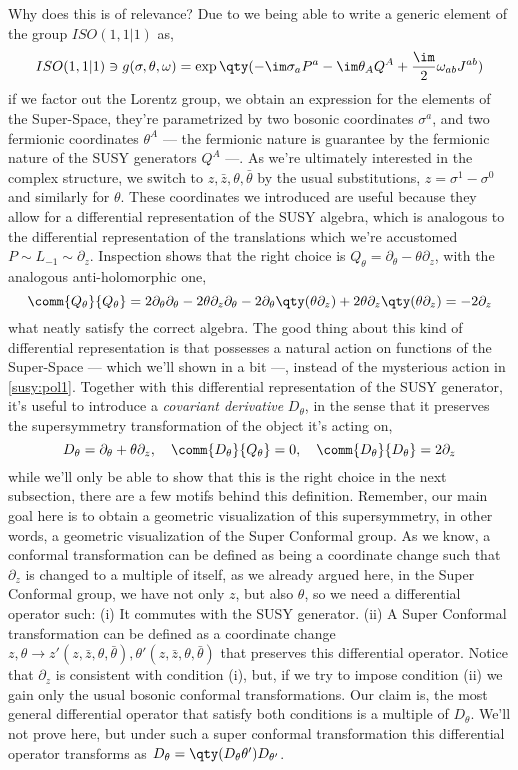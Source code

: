 Why does this is of relevance? Due to we being able to write a generic element of the group $ISO(1,1|1)$ as,
$$ISO(1,1|1)\ni g(\sigma,\theta,\omega)=\exp\qty(-\im \sigma_aP^a-\im \theta_A Q^A+\frac\im2\omega_{ab}J^{ab})$$
if we factor out the Lorentz group, we obtain an expression for the elements of the Super-Space, they're 
parametrized by two bosonic coordinates $\sigma^a$, and two fermionic coordinates $\theta^A$ --- 
the fermionic nature is guarantee by the fermionic nature of the SUSY generators $Q^A$ ---. As 
we're ultimately interested in the complex structure, we switch to $z,\bar z,\theta,\bar\theta$ by 
the usual substitutions, $z=\sigma^1-\sigma^0$ and similarly for $\theta$. These coordinates we introduced 
are useful because they allow for a differential representation of the SUSY algebra, which is analogous 
to the differential representation of the translations which we're accustomed $P\sim L_{-1}\sim \partial_z$. 
Inspection shows that the right choice is $Q_\theta=\partial_\theta-\theta\partial_z$, with the analogous 
anti-holomorphic one, $$\comm{Q_\theta}{Q_\theta}=2\partial_\theta\partial_\theta-2\theta\partial_z\partial_\theta-2\partial_\theta\qty(\theta\partial_z)+2\theta\partial_z\qty(\theta\partial_z)=-2\partial_z$$
what neatly satisfy the correct algebra. The good thing about this kind of differential representation is that 
possesses a natural action on functions of the Super-Space --- which we'll shown in a bit ---, instead of the mysterious action in \eqref{susy:pol1}. 
Together with this differential representation of the SUSY generator, it's useful to introduce a 
\textit{covariant derivative} $D_\theta$, in the sense that it preserves the supersymmetry transformation 
of the object it's acting on, $$D_\theta=\partial_\theta+\theta\partial_z,\ \ \ \comm{D_\theta}{Q_\theta}=0,\ \ \ \comm{D_\theta}{D_\theta}=2\partial_z$$
while we'll only be able to show that this is the right choice in the next subsection, there are a few 
motifs behind this definition. Remember, our main goal here is to obtain a geometric visualization of this 
supersymmetry, in other words, a geometric visualization of the Super Conformal group. As we know, a conformal 
transformation can be defined as being a coordinate change such that $\partial_z$ is changed to a 
multiple of itself, as we already argued here, in the Super Conformal group, we have not only $z$, 
but also $\theta$, so we need a differential operator such: (i) It commutes with the SUSY generator. 
(ii) A Super Conformal transformation can be defined as a coordinate change $z,\theta\rightarrow z'(z,\bar z,\theta,\bar\theta),\theta'(z,\bar z,\theta,\bar\theta)$ 
that preserves this differential operator. Notice that $\partial_z$ is consistent with condition (i), but, 
if we try to impose condition (ii) we gain only the usual bosonic conformal transformations. Our claim is, 
the most general differential operator that satisfy both conditions is a multiple of $D_\theta$. We'll 
not prove here, but under such a super conformal transformation this differential operator transforms as 
$D_\theta=\qty(D_\theta\theta')D_{\theta'}$. 

